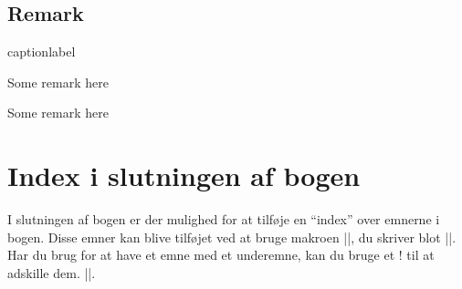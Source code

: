 \subsection{Remark}
\begin{LaTeXCode}{caption}{label}
\begin{remark}
	Some remark here
\end{remark}
\end{LaTeXCode}
\begin{remark}
	Some remark here
\end{remark}

\section{Index i slutningen af bogen}
I slutningen af bogen er der mulighed for at tilføje en ``index'' over emnerne 
i bogen.
Disse emner kan blive tilføjet ved at bruge makroen \LaTeXInline|\index|, 
du 
skriver blot \LaTeXInline||. Har du brug for 
at have et emne med et underemne, kan du bruge et ! til at adskille dem. 
\LaTeXInline||.